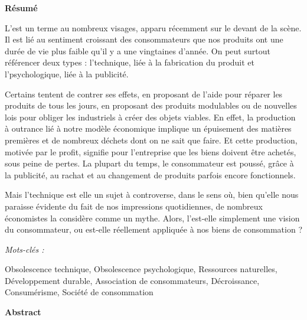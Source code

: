 
\begin{Large}
\textbf{Résumé}
\end{Large}

\vspace{1\baselineskip}

L'\op est un terme au nombreux visages, apparu récemment sur le devant de la scène. Il est lié au sentiment croissant des consommateurs que nos produits ont une durée de vie plus faible qu'il y a une vingtaines d'année. 
On peut surtout référencer deux types : l'\op technique, liée à la fabrication du produit et l'\op psychologique, liée à la publicité.

Certains tentent de contrer ses effets, en proposant de l'aide pour réparer les produits de tous les jours, en proposant des produits modulables ou de nouvelles lois pour obliger les industriels à créer des objets viables. 
En effet, la production à outrance lié à notre modèle économique implique un épuisement des matières premières et de nombreux déchets dont on ne sait que faire. Et cette production, motivée par le profit, signifie pour l'entreprise que les biens doivent être achetés, sous peine de pertes. La plupart du temps, le consommateur est poussé, grâce à la publicité, au rachat et au changement de produits parfois encore fonctionnels. 

Mais l'\op technique est elle un sujet à controverse, dans le sens où, bien qu'elle nous paraisse évidente du fait de nos impressions quotidiennes, de nombreux économistes la considère comme un mythe. Alors, l'\op est-elle simplement une vision du consommateur, ou est-elle réellement appliquée à nos biens de consommation ?

\vspace{2\baselineskip}

\begin{large} \emph{Mots-clés :} \end{large}Obsolescence technique, Obsolescence psychologique, Ressources naturelles, Développement durable, Association de consommateurs, Décroissance, Consumérisme, Société de consommation


\vspace{4\baselineskip}



\begin{Large}
\textbf{Abstract}
\end{Large}

\vspace{1\baselineskip}

